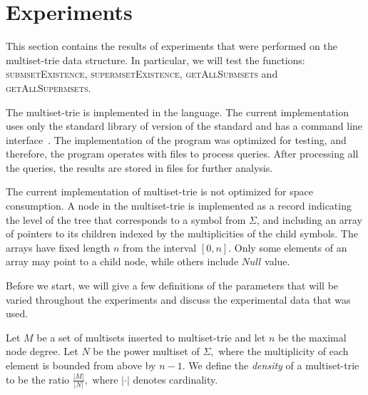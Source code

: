 \section{Experiments} \label{c:experiments}

%
This section contains the results of experiments that were performed on the multiset-trie 
data structure. In particular, we will test the functions: \textsc{submsetExistence}, 
\textsc{supermsetExistence}, \textsc{getAllSubmsets} and \textsc{getAllSupermsets}. 

The multiset-trie is implemented in the  language. 
The current implementation uses only the standard library of  version of the 
standard and has a command line interface~\cite{akulich2019mstrie}. The implementation of the program was 
optimized for testing, and therefore, the program operates with files to 
process queries. After processing all the queries, the results are stored in files for further analysis.

The current implementation of multiset-trie is not optimized for space consumption.
A node in the multiset-trie is implemented as a record indicating the level of the tree
that corresponds to a symbol from $\Sigma$, and including an array of pointers to
its children indexed by the multiplicities of the child symbols. The arrays have
fixed length $n$ from the interval $[0,n].$
Only some elements of an array may point to a child node, while others include
$Null$ value.


Before we start, we will give a few definitions of the parameters 
that will be varied throughout the experiments and discuss the experimental data 
that was used.

Let $M$ be a set of multisets inserted to multiset-trie and let $n$ be 
the maximal node degree. Let $N$ be the power multiset of $\Sigma,$ where 
the multiplicity of each element is bounded from above by $n-1.$ We define the 
\emph{density} of a multiset-trie to be the ratio $\frac{|M|}{|N|},$ where 
$|\cdot|$ denotes cardinality.

